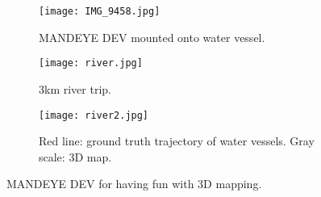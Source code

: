 \begin{figure}
	\centering
	\begin{subfigure}[b]{0.4\textwidth}
		\centering
		\texttt{[image: IMG\_9458.jpg]}
		\caption{MANDEYE DEV mounted onto water vessel.}
		\label{fig:a2}
	\end{subfigure}
	\hfill
	\begin{subfigure}[b]{0.7\textwidth}
		\centering
		\texttt{[image: river.jpg]}
		\caption{3km river trip.}
		\label{fig:b2}
	\end{subfigure}
	\hfill
	\begin{subfigure}[b]{0.7\textwidth}
		\centering
		\texttt{[image: river2.jpg]}
		\caption{Red line: ground truth trajectory of water vessels. Gray scale: 3D map.}
		\label{fig:c2}
	\end{subfigure}
	\caption{MANDEYE DEV for having fun with 3D mapping.}
	\label{fig:a2b2c2}
\end{figure}


